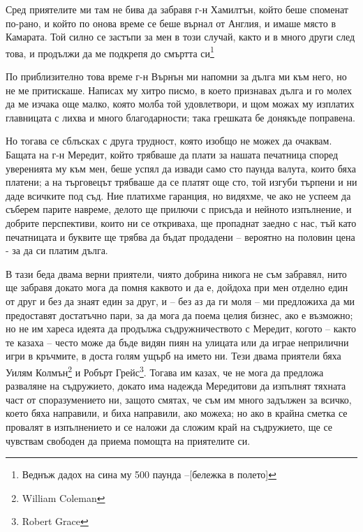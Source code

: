 \documentclass[12pt]{book}
\begin{document}
Сред приятелите ми там не бива да забравя г-н Хамилтън, който беше споменат по-рано, и който по онова време се беше върнал от Англия, и имаше място в Камарата. Той силно се застъпи за мен в този случай, както и в много други след това, и продължи да ме подкрепя до смъртта си\footnote{Веднъж дадох на сина му 500 паунда –[бележка в полето]}

По приблизително това време г-н Върнън ми напомни за дълга ми към него, но не ме притискаше. Написах му хитро писмо, в което признавах дълга и го молех да ме изчака още малко, която молба той удовлетвори, и щом можах му изплатих главницата с лихва и много благодарности; така грешката бе донякъде поправена.

Но тогава се сблъсках с друга трудност, която изобщо не можех да очаквам. Бащата на г-н Мередит, който трябваше да плати за нашата печатница според уверенията му към мен, беше успял да извади само сто паунда валута, които бяха платени; а на търговецът трябваше да се платят още сто, той изгуби търпени и ни даде всичките под съд. Ние платихме гаранция, но видяхме, че ако не успеем да съберем парите навреме, делото ще прилючи с присъда и нейното изпълнение, и добрите перспективи, които ни се откриваха, ще пропаднат заедно с нас, тъй като печатницата и буквите ще трябва да бъдат продадени – вероятно на половин цена - за да си платим дълга.

В тази беда двама верни приятели, чиято добрина никога не съм забравял, нито ще забравя докато мога да помня каквото и да е, дойдоха при мен отделно един от друг и без да знаят един за друг, и – без аз да ги моля – ми предложиха да ми предоставят достатъчно пари, за да мога да поема целия бизнес, ако е възможно; но не им хареса идеята да продължа съдружничеството с Мередит, когото – както те казаха – често може да бъде видян пиян на улицата или да играе неприлични игри в кръчмите, в доста голям ущърб на името ни. Тези двама приятели бяха Уилям Колмън\footnote{William Coleman} и Робърт Грейс\footnote{Robert Grace}. Тогава им казах, че не мога да предложа разваляне на съдружието, докато има надежда Мередитови да изпълнят тяхната част от споразумението ни, защото смятах, че съм им много задължен за всичко, което бяха направили, и биха направили, ако можеха; но ако в крайна сметка се провалят в изпълнението и се наложи да сложим край на съдружието, ще се чувствам свободен да приема помощта на приятелите си.
\end{document}
